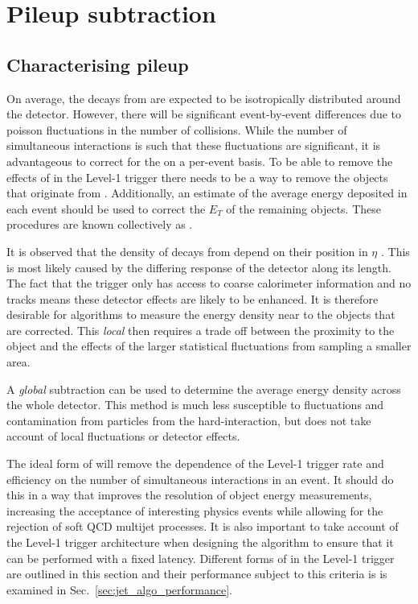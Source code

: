 \section{Pileup subtraction}
\label{sec:pus}

\subsection{Characterising pileup}
 
On average, the decays from \PU are expected to be isotropically
distributed around the detector. However, there will be significant
event-by-event differences due to poisson fluctuations in the number
of \PU collisions. While the number of simultaneous interactions is
such that these fluctuations are significant, it is advantageous to
correct for the \PU on a per-event basis. To be able to remove the
effects of \PU in the Level-1 trigger there needs to be a way to remove
the objects that originate from \PU. Additionally, an
estimate of the average energy deposited in each event should be used
to correct the $E_T$ of the remaining objects. These procedures are
known collectively as \emph{\PUS}.

It is observed that the density of decays from \PU 
depend on their position in $\eta$ \cite{Cacciari2011}. This is
most likely caused by the differing response of the detector along its
length. The fact that the trigger only has access to
coarse calorimeter information and no tracks means these detector
effects are likely to be enhanced. It is therefore desirable for \PUS
algorithms to measure the \PU energy density near to the objects that
are corrected. This \emph{local} \PUS then requires a trade off
between the proximity to the object and the effects of the
larger statistical fluctuations from sampling a smaller area. 

A \emph{global} subtraction can be used to determine the average
energy density across the whole detector. This method is much less
susceptible to fluctuations and contamination from particles from the
hard-interaction, but does not take account of local fluctuations or
detector effects.

The ideal form of \PUS will remove the dependence of the Level-1
trigger rate and efficiency on the number of simultaneous interactions
in an event. It should do this in a way that improves the resolution
of object energy measurements, increasing the acceptance
of interesting physics events while allowing for the rejection of soft
QCD multijet processes. It is also important to take account of the
Level-1 trigger architecture when designing the algorithm to ensure
that it can be performed with a fixed latency. Different forms of \PUS
in the Level-1 trigger are outlined in this section and their
performance subject to this criteria is is examined in
Sec.~\ref{sec:jet_algo_performance}. 

